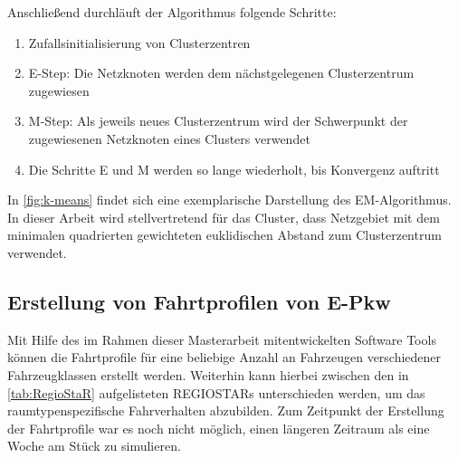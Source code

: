 
\noindent Anschließend durchläuft der Algorithmus folgende Schritte:

\begin{enumerate}
	\item Zufallsinitialisierung von Clusterzentren
	\item E-Step: Die Netzknoten werden dem nächstgelegenen Clusterzentrum zugewiesen
	\item M-Step: Als jeweils neues Clusterzentrum wird der Schwerpunkt der zugewiesenen Netzknoten eines Clusters verwendet
	\item Die Schritte E und M werden so lange wiederholt, bis Konvergenz auftritt
\end{enumerate}


In \autoref{fig:k-means} findet sich eine exemplarische Darstellung des EM-Algorithmus.
In dieser Arbeit wird stellvertretend für das Cluster, dass Netzgebiet mit dem minimalen quadrierten gewichteten euklidischen Abstand zum Clusterzentrum verwendet. \cite{Mueller2019}




\subsection{Erstellung von Fahrtprofilen von E-Pkw}\label{chap:simbev_theo}


Mit Hilfe des im Rahmen dieser Masterarbeit mitentwickelten Software Tools \simbev können die Fahrtprofile für eine beliebige Anzahl an Fahrzeugen verschiedener Fahrzeugklassen erstellt werden.
Weiterhin kann hierbei zwischen den in \autoref{tab:RegioStaR} aufgelisteten \glspl{REGIOSTAR} unterschieden werden, um das raumtypenspezifische Fahrverhalten abzubilden.
Zum Zeitpunkt der Erstellung der Fahrtprofile war es noch nicht möglich, einen längeren Zeitraum als eine Woche am Stück zu simulieren.



